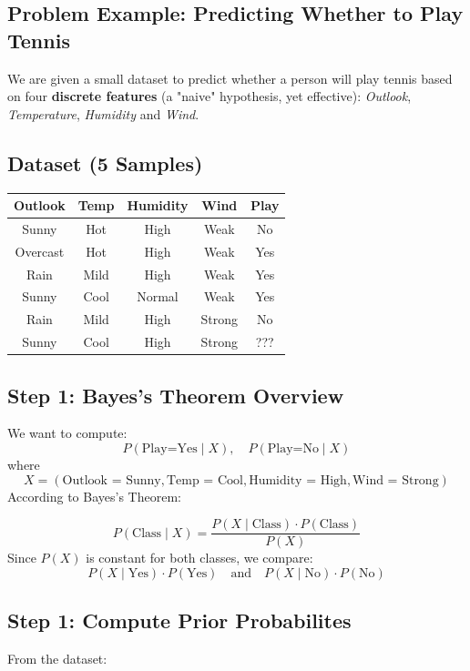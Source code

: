 \documentclass{article}
\begin{document}
\subsection*{Problem Example: Predicting Whether to Play Tennis}

We are given a small dataset to predict whether a person will play tennis based on four \textbf{discrete features} (a "naive" hypothesis, yet effective): \textit{Outlook}, \textit{Temperature}, \textit{Humidity} and \textit{Wind}.

\subsection*{Dataset (5 Samples)}

\begin{center}
\begin{tabular}{|c|c|c|c|c|}
\hline
Outlook & Temp & Humidity & Wind & Play \\
\hline
Sunny & Hot & High & Weak & No \\
Overcast & Hot & High & Weak & Yes \\
Rain & Mild & High & Weak & Yes \\
Sunny & Cool & Normal & Weak & Yes \\
Rain & Mild & High & Strong & No \\
Sunny & Cool & High & Strong & ??? \\
\hline
\end{tabular}
\end{center}

\subsection*{Step 1: Bayes's Theorem Overview}
We want to compute:
$$
P(\text{Play=Yes} \mid X), \quad P(\text{Play=No} \mid X)
$$
where $$X = (\text{Outlook = Sunny}, \text{Temp = Cool}, \text{Humidity = High}, \text{Wind = Strong})$$
According to Bayes's Theorem:

$$
P(\text{Class} \mid X) = \frac{P(X \mid \text{Class}) \cdot P(\text{Class})}{P(X)}
$$
Since $P(X)$ is constant for both classes, we compare:
$$
P(X \mid \text{Yes}) \cdot P(\text{Yes}) \quad \text{and} \quad P(X \mid \text{No}) \cdot P(\text{No})
$$

\subsection*{Step 1: Compute Prior Probabilites}
From the dataset:
\end{document}
